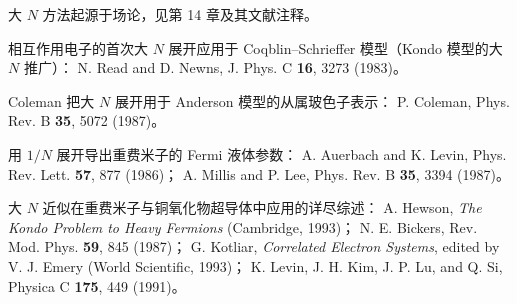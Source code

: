 \begin{chapbib}
\item 大 $N$ 方法起源于场论，见第 14 章及其文献注释。
\item 相互作用电子的首次大 $N$ 展开应用于 Coqblin--Schrieffer 模型（Kondo 模型的大 $N$ 推广）：
  N. Read and D. Newns, J. Phys. C \textbf{16}, 3273 (1983)。
\item Coleman 把大 $N$ 展开用于 Anderson 模型的从属玻色子表示：
  P. Coleman, Phys. Rev. B \textbf{35}, 5072 (1987)。
\item 用 $1/N$ 展开导出重费米子的 Fermi 液体参数：
  A. Auerbach and K. Levin, Phys. Rev. Lett. \textbf{57}, 877 (1986)；
  A. Millis and P. Lee, Phys. Rev. B \textbf{35}, 3394 (1987)。
\item 大 $N$ 近似在重费米子与铜氧化物超导体中应用的详尽综述：
  A. Hewson, \textit{The Kondo Problem to Heavy Fermions} (Cambridge, 1993)；
  N. E. Bickers, Rev. Mod. Phys. \textbf{59}, 845 (1987)；
  G. Kotliar, \textit{Correlated Electron Systems}, edited by V. J. Emery (World Scientific, 1993)；
  K. Levin, J. H. Kim, J. P. Lu, and Q. Si, Physica C \textbf{175}, 449 (1991)。
\end{chapbib}

